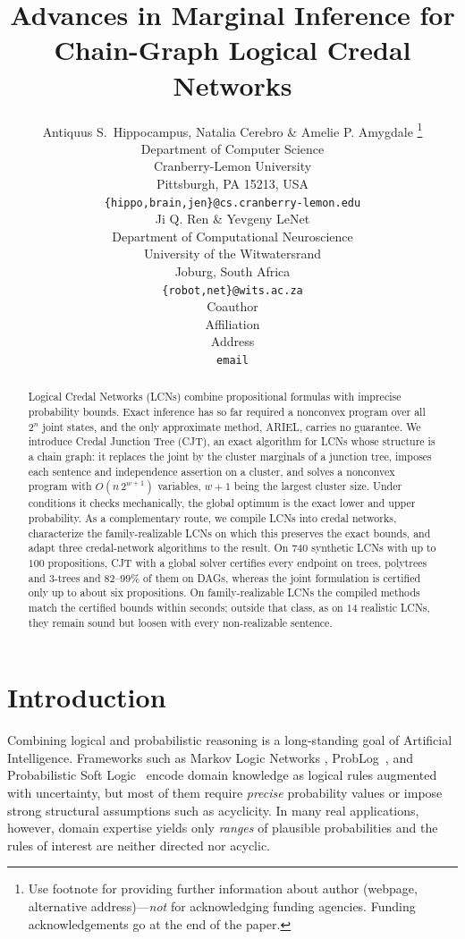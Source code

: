 \documentclass{article} %
\title{Advances in Marginal Inference for\\ Chain-Graph Logical Credal Networks}
\author{Antiquus S.~Hippocampus, Natalia Cerebro \& Amelie P. Amygdale \thanks{ Use footnote for providing further information
about author (webpage, alternative address)---\emph{not} for acknowledging
funding agencies.  Funding acknowledgements go at the end of the paper.} \\
Department of Computer Science\\
Cranberry-Lemon University\\
Pittsburgh, PA 15213, USA \\
\texttt{\{hippo,brain,jen\}@cs.cranberry-lemon.edu} \\
\And
Ji Q. Ren \& Yevgeny LeNet \\
Department of Computational Neuroscience \\
University of the Witwatersrand \\
Joburg, South Africa \\
\texttt{\{robot,net\}@wits.ac.za} \\
\AND
Coauthor \\
Affiliation \\
Address \\
\texttt{email}
}
\DeclareRobustCommand{\rev}[1]{{\color{blue}#1}}
\begin{document}


\maketitle

\begin{abstract}
    \rev{Logical Credal Networks (LCNs) combine propositional formulas with imprecise probability bounds. Exact inference has so far required a nonconvex program over all $2^n$ joint states, and the only approximate method, ARIEL, carries no guarantee. We introduce Credal Junction Tree (CJT), an exact algorithm for LCNs whose structure is a chain graph: it replaces the joint by the cluster marginals of a junction tree, imposes each sentence and independence assertion on a cluster, and solves a nonconvex program with $O(n\,2^{w+1})$ variables, $w+1$ being the largest cluster size. Under conditions it checks mechanically, the global optimum is the exact lower and upper probability. As a complementary route, we compile LCNs into credal networks, characterize the family-realizable LCNs on which this preserves the exact bounds, and adapt three credal-network algorithms to the result. On $740$ synthetic LCNs with up to $100$ propositions, CJT with a global solver certifies every endpoint on trees, polytrees and $3$-trees and $82$--$99\%$ of them on DAGs, whereas the joint formulation is certified only up to about six propositions. On family-realizable LCNs the compiled methods match the certified bounds within seconds; outside that class, as on $14$ realistic LCNs, they remain sound but loosen with every non-realizable sentence.}
\end{abstract}

\section{Introduction}
\label{sec-intro}

Combining logical and probabilistic reasoning is a long-standing goal of Artificial Intelligence. Frameworks such as Markov Logic Networks \citep{mln}, ProbLog~\citep{problog}, and Probabilistic Soft Logic~\citep{bach2017psl} encode domain knowledge as logical rules augmented with uncertainty, but most of them require \emph{precise} probability values or impose strong structural assumptions such as acyclicity. In many real applications, however, domain expertise yields only \emph{ranges} of plausible probabilities and the rules of interest are neither directed nor acyclic.
\end{document}

